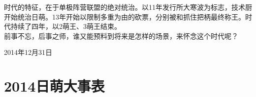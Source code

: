 时代的特征，在于单极阵营联盟的绝对统治。以11年发行所大寒波为标志，技术厨开始统治日萌。13年开始以限制多重为由的砍票，分别被和抓住把柄最终称王。时代持续了四年，以2萌王、3萌王结束。
\\

前事不忘，后事之师，谁又能预料到将来是怎样的场景，来怀念这个时代呢？

\begin{flushright}
 \rm{}

 \kai 2014年12月31日
\end{flushright}

\chapter*{2014日萌大事表}

